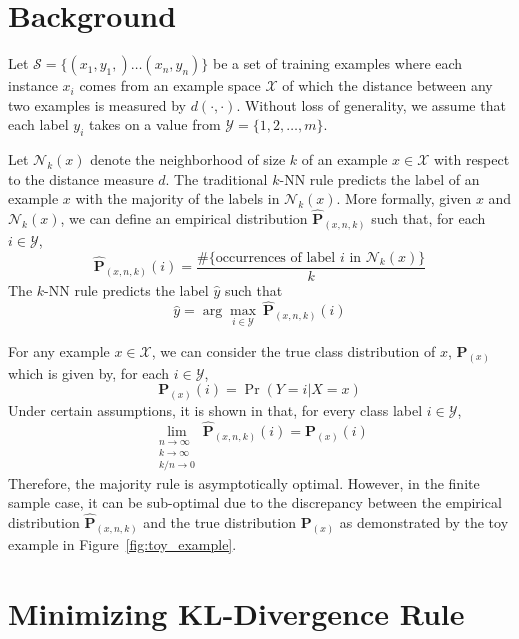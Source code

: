 \documentclass{article}
\begin{document}
\section{Background}
\label{sec:background}

\newcommand{\X}{\mathcal{X}}
\newcommand{\Y}{\mathcal{Y}}
\newcommand{\trainset}{\mathcal{S}}

Let $\trainset = \{ (x_1,y_1,) \ldots (x_n,y_n)\}$ be a set of
training examples where each instance $x_i$ comes from an example
space $\X$ of which the distance between any two examples is measured by
$d(\cdot,\cdot)$. Without loss of generality, we assume that each
label $y_i$ takes on a value from $\Y = \{1,2,\ldots,m\}$.

\newcommand{\nh}{\mathcal{N}}
\newcommand{\Pemp}{\widehat{\mathbf{P}}_{(x,n,k)}}
\newcommand{\Ptrue}{\mathbf{P}_{(x)}}

Let $\nh_k(x)$ denote the neighborhood of size $k$ of an example $x
\in \X$ with respect to the distance measure $d$. The traditional
$k$-NN rule predicts the label of an example $x$ with the majority of
the labels in $\nh_k(x)$. More formally, given $x$ and $\nh_k(x)$, we
can define an empirical distribution $\Pemp$ such that, for each $i \in \Y$, 
\[
\Pemp(i) = \frac{\#\{ \mbox{occurrences of label } i \mbox{ in } \nh_k(x)\}}{k}
\]
The $k$-NN rule predicts the label $\hat{y}$ such that
\[
\hat{y} = \arg\max_{i \in \Y} \: \Pemp(i)
\]

For any example $x \in \X$, we can consider the true class
distribution of $x$, $\Ptrue$ which is given by, for each $i \in \Y$,
\[
\Ptrue(i) = \Pr(Y=i | X=x)
\]
Under certain assumptions, it is shown in \cite{Fix1951} that,
for every class label $i \in \Y$, 
\[
\lim_{\substack{n \to \infty\\k \to \infty\\k/n \to 0}} \Pemp(i) = \Ptrue(i)
\]
Therefore, the majority rule is asymptotically optimal. However, in
the finite sample case, it can be sub-optimal due to the discrepancy
between the empirical distribution $\Pemp$ and the true distribution
$\Ptrue$ as demonstrated by the toy example in
Figure~\ref{fig:toy_example}.

\section{Minimizing KL-Divergence Rule}
\label{sec:min_kl}

\newcommand{\dkl}{D_{\mathrm{KL}}}
\newcommand{\Qemp}{\widehat{\mathbf{Q}}_(j,n,k)}
\newcommand{\Qtrue}{\mathbf{Q}_(j)}
\end{document}
